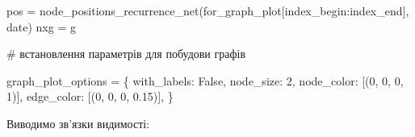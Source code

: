 \documentclass[
  letterpaper,
]{report}
\newenvironment{Shaded}{\begin{snugshade}}{\end{snugshade}}
\newcommand{\CommentTok}[1]{\textcolor[rgb]{0.37,0.37,0.37}{#1}}
\newcommand{\DecValTok}[1]{\textcolor[rgb]{0.68,0.00,0.00}{#1}}
\newcommand{\FloatTok}[1]{\textcolor[rgb]{0.68,0.00,0.00}{#1}}
\newcommand{\NormalTok}[1]{\textcolor[rgb]{0.00,0.23,0.31}{#1}}
\newcommand{\OperatorTok}[1]{\textcolor[rgb]{0.37,0.37,0.37}{#1}}
\newcommand{\StringTok}[1]{\textcolor[rgb]{0.13,0.47,0.30}{#1}}
\newcommand{\VariableTok}[1]{\textcolor[rgb]{0.07,0.07,0.07}{#1}}
\begin{document}
\begin{Shaded}
\begin{Highlighting}[]
\NormalTok{    pos }\OperatorTok{=}\NormalTok{ node\_positions\_recurrence\_net(for\_graph\_plot[index\_begin:index\_end], date)}
\NormalTok{    nxg }\OperatorTok{=}\NormalTok{ g}
    
    
\CommentTok{\# встановлення параметрів для побудови графів}

\NormalTok{graph\_plot\_options }\OperatorTok{=}\NormalTok{ \{}
    \StringTok{\textquotesingle{}with\_labels\textquotesingle{}}\NormalTok{: }\VariableTok{False}\NormalTok{,}
    \StringTok{\textquotesingle{}node\_size\textquotesingle{}}\NormalTok{: }\DecValTok{2}\NormalTok{,}
    \StringTok{\textquotesingle{}node\_color\textquotesingle{}}\NormalTok{: [(}\DecValTok{0}\NormalTok{, }\DecValTok{0}\NormalTok{, }\DecValTok{0}\NormalTok{, }\DecValTok{1}\NormalTok{)],}
    \StringTok{\textquotesingle{}edge\_color\textquotesingle{}}\NormalTok{: [(}\DecValTok{0}\NormalTok{, }\DecValTok{0}\NormalTok{, }\DecValTok{0}\NormalTok{, }\FloatTok{0.15}\NormalTok{)],}
\NormalTok{\}}
\end{Highlighting}
\end{Shaded}

Виводимо зв'язки видимості:
\end{document}
